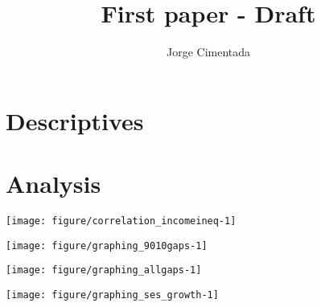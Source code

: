\documentclass[11pt, a4paper]{article}\usepackage[]{graphicx}\usepackage[]{color}
\title{First paper - Draft}
\author{Jorge Cimentada}
\begin{document}
\setlength{\parindent}{2em}
\setlength{\parskip}{1em}

\maketitle





\tableofcontents












\section{Descriptives}





\section{Analysis}



{\centering \texttt{[image: figure/correlation\_incomeineq-1]} 

}






{\centering \texttt{[image: figure/graphing\_9010gaps-1]} 

}






{\centering \texttt{[image: figure/graphing\_allgaps-1]} 

}






{\centering \texttt{[image: figure/graphing\_ses\_growth-1]} 

}




\end{document}
